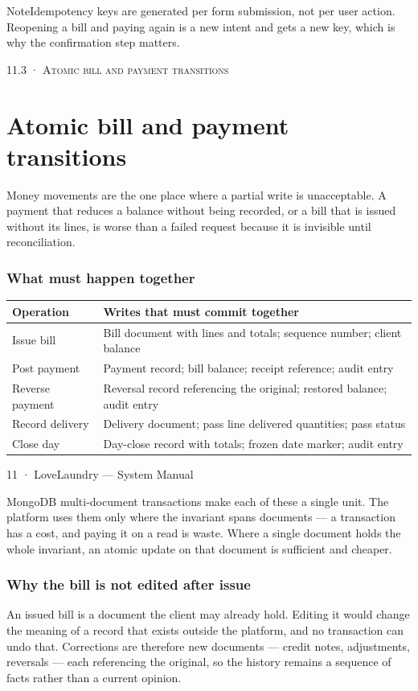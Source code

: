 \documentclass[11pt,a4paper,oneside]{book}
\begin{document}
\begin{notebox}NoteIdempotency keys are generated per form submission, not per user action. Reopening a bill and paying again is a new intent and gets a new key, which is why the confirmation step matters.\end{notebox}
\textsc{\small\color{crimson}11.3 · Atomic bill and payment transitions}\par\medskip
\section*{Atomic bill and payment transitions}
Money movements are the one place where a partial write is unacceptable. A payment that reduces a balance without being recorded, or a bill that is issued without its lines, is worse than a failed request because it is invisible until reconciliation.

\subsubsection*{What must happen together}
\begin{center}\small
\begin{tabularx}{\linewidth}{|X|X|}
\hline
\rowcolor{lightgrey}
\textbf{Operation} & \textbf{Writes that must commit together} \\ \hline
Issue bill & Bill document with lines and totals; sequence number; client balance \\ \hline
Post payment & Payment record; bill balance; receipt reference; audit entry \\ \hline
Reverse payment & Reversal record referencing the original; restored balance; audit entry \\ \hline
Record delivery & Delivery document; pass line delivered quantities; pass status \\ \hline
Close day & Day-close record with totals; frozen date marker; audit entry \\ \hline
\end{tabularx}
\end{center}
11 · LoveLaundry — System Manual

MongoDB multi-document transactions make each of these a single unit. The platform uses them only where the invariant spans documents — a transaction has a cost, and paying it on a read is waste. Where a single document holds the whole invariant, an atomic update on that document is sufficient and cheaper.

\subsubsection*{Why the bill is not edited after issue}
An issued bill is a document the client may already hold. Editing it would change the meaning of a record that exists outside the platform, and no transaction can undo that. Corrections are therefore new documents — credit notes, adjustments, reversals — each referencing the original, so the history remains a sequence of facts rather than a current opinion.
\end{document}
